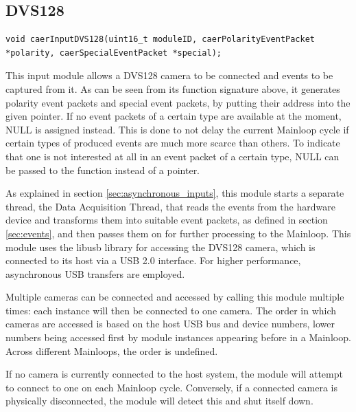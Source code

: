 \documentclass[a4paper,12pt]{report}
\begin{document}
\subsection{DVS128} \label{subsec:dvs128}

\begin{lstlisting}
void caerInputDVS128(uint16_t moduleID, caerPolarityEventPacket *polarity, caerSpecialEventPacket *special);
\end{lstlisting}

This input module allows a DVS128 camera to be connected and events to be captured from it.
As can be seen from its function signature above, it generates polarity event packets and special event packets, by putting their address into the given pointer. If no event packets of a certain type are available at the moment, NULL is assigned instead. This is done to not delay the current Mainloop cycle if certain types of produced events are much more scarce than others. To indicate that one is not interested at all in an event packet of a certain type, NULL can be passed to the function instead of a pointer.

As explained in section \ref{sec:asynchronous_inputs}, this module starts a separate thread, the Data Acquisition Thread, that reads the events from the hardware device and transforms them into suitable event packets, as defined in section \ref{sec:events}, and then passes them on for further processing to the Mainloop.
This module uses the libusb library for accessing the DVS128 camera, which is connected to its host via a USB 2.0 interface. For higher performance, asynchronous USB transfers are employed.

Multiple cameras can be connected and accessed by calling this module multiple times: each instance will then be connected to one camera. The order in which cameras are accessed is based on the host USB bus and device numbers, lower numbers being accessed first by module instances appearing before in a Mainloop. Across different Mainloops, the order is undefined.

If no camera is currently connected to the host system, the module will attempt to connect to one on each Mainloop cycle. Conversely, if a connected camera is physically disconnected, the module will detect this and shut itself down.
\end{document}
